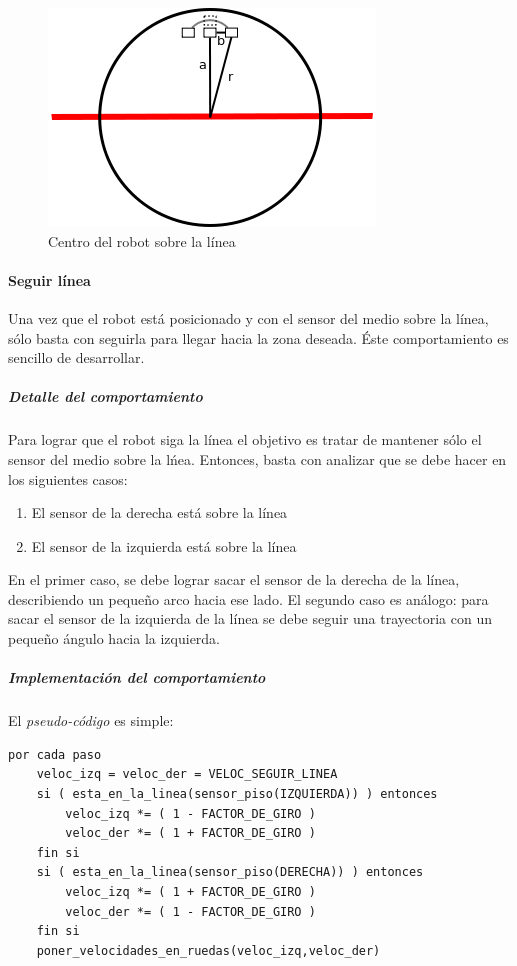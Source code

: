 \begin{figure}[htp]
\begin{center}
\includegraphics[scale=0.4]{comportamientos/floorSensorsLine3.png}
\caption{Centro del robot sobre la l\'inea}
\label{fig:positioned}
\end{center}
\end{figure}

\paragraph{Seguir l\'inea}
\label{follow_line}
Una vez que el robot est\'a posicionado y con el sensor del medio sobre la l\'inea,
s\'olo basta con seguirla para llegar hacia la zona deseada. \'Este comportamiento
es sencillo de desarrollar.

\subparagraph{Detalle del comportamiento}
Para lograr que el robot siga la l\'inea el objetivo es tratar de mantener s\'olo el
sensor del medio sobre la l\'nea. Entonces, basta con analizar que se debe hacer en los
siguientes casos:
\begin{enumerate}
	\item El sensor de la derecha est\'a sobre la l\'inea
	\item El sensor de la izquierda est\'a sobre la l\'inea
\end{enumerate}
En el primer caso, se debe lograr sacar el sensor de la derecha de la l\'inea,
describiendo un peque\~no arco hacia ese lado. El segundo caso es an\'alogo:
para sacar el sensor de la izquierda de la l\'inea se debe seguir una trayectoria
con un peque\~no \'angulo hacia la izquierda. 

\subparagraph{Implementaci\'on del comportamiento}
El \emph{pseudo-c\'odigo} es simple:
\begin{verbatim}
por cada paso
    veloc_izq = veloc_der = VELOC_SEGUIR_LINEA
    si ( esta_en_la_linea(sensor_piso(IZQUIERDA)) ) entonces
        veloc_izq *= ( 1 - FACTOR_DE_GIRO )
        veloc_der *= ( 1 + FACTOR_DE_GIRO )
    fin si
    si ( esta_en_la_linea(sensor_piso(DERECHA)) ) entonces
        veloc_izq *= ( 1 + FACTOR_DE_GIRO )
        veloc_der *= ( 1 - FACTOR_DE_GIRO )
    fin si
    poner_velocidades_en_ruedas(veloc_izq,veloc_der)
\end{verbatim}

